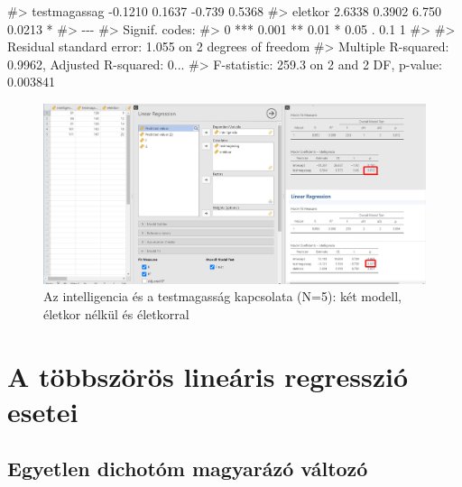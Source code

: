 \documentclass[
  letterpaper,
]{krantz}
\makeatletter
\newenvironment{Shaded}{\begin{snugshade}}{\end{snugshade}}
\newcommand{\CommentTok}[1]{\textcolor[rgb]{0.37,0.37,0.37}{#1}}
\newenvironment{kframe}{%
\medskip{}
\setlength{\fboxsep}{.8em}
 \def\at@end@of@kframe{}%
 \ifinner\ifhmode%
  \def\at@end@of@kframe{\end{minipage}}%
  \begin{minipage}{\columnwidth}%
 \fi\fi%
 \def\FrameCommand##1{\hskip\@totalleftmargin \hskip-\fboxsep
 \colorbox{shadecolor}{##1}\hskip-\fboxsep
     \hskip-\linewidth \hskip-\@totalleftmargin \hskip\columnwidth}%
 \MakeFramed {\advance\hsize-\width
   \@totalleftmargin\z@ \linewidth\hsize
   \@setminipage}}%
 {\par\unskip\endMakeFramed%
 \at@end@of@kframe}
\renewenvironment{Shaded}{\begin{kframe}}{\end{kframe}}
\makeatother
\begin{document}
\begin{Shaded}
\begin{Highlighting}[]
\CommentTok{\#\textgreater{} testmagassag  {-}0.1210     0.1637  {-}0.739   0.5368  }
\CommentTok{\#\textgreater{} eletkor        2.6338     0.3902   6.750   0.0213 *}
\CommentTok{\#\textgreater{} {-}{-}{-}}
\CommentTok{\#\textgreater{} Signif. codes:  }
\CommentTok{\#\textgreater{} 0 \textquotesingle{}***\textquotesingle{} 0.001 \textquotesingle{}**\textquotesingle{} 0.01 \textquotesingle{}*\textquotesingle{} 0.05 \textquotesingle{}.\textquotesingle{} 0.1 \textquotesingle{} \textquotesingle{} 1}
\CommentTok{\#\textgreater{} }
\CommentTok{\#\textgreater{} Residual standard error: 1.055 on 2 degrees of freedom}
\CommentTok{\#\textgreater{} Multiple R{-}squared:  0.9962, Adjusted R{-}squared:  0...}
\CommentTok{\#\textgreater{} F{-}statistic: 259.3 on 2 and 2 DF,  p{-}value: 0.003841}
\end{Highlighting}
\end{Shaded}

\begin{figure}

{\centering \includegraphics{./images/lin_reg_intelligencia_testmagassag_eletkor_01_kep_02.jpg}

}

\caption{Az intelligencia és a testmagasság kapcsolata (N=5): két
modell, életkor nélkül és életkorral}

\end{figure}

\hypertarget{a-tuxf6bbszuxf6ruxf6s-lineuxe1ris-regressziuxf3-esetei}{%
\section{A többszörös lineáris regresszió
esetei}\label{a-tuxf6bbszuxf6ruxf6s-lineuxe1ris-regressziuxf3-esetei}}

\hypertarget{egyetlen-dichotuxf3m-magyaruxe1zuxf3-vuxe1ltozuxf3}{%
\subsection{Egyetlen dichotóm magyarázó
változó}\label{egyetlen-dichotuxf3m-magyaruxe1zuxf3-vuxe1ltozuxf3}}
\end{document}
